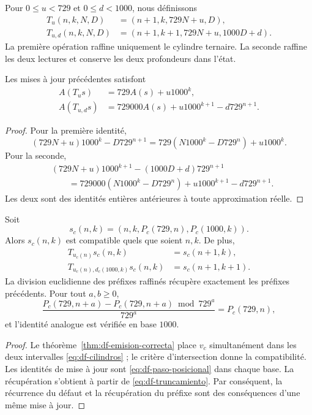 \begin{definition}
Pour \(0\leq u<729\) et \(0\leq d<1000\), nous définissons
\begin{align*}
 T_u(n,k,N,D)&=(n+1,k,729N+u,D),\\
 T_{u,d}(n,k,N,D)&=(n+1,k+1,729N+u,1000D+d).
\end{align*}
La première opération raffine uniquement le cylindre ternaire. La seconde  
raffine les deux lectures et conserve les deux profondeurs dans l'état.
\end{definition}

\begin{proposition}
\label{prop:df-rec-frontera}
Les mises à jour précédentes satisfont
\begin{align}
 A(T_u s)&=729A(s)+u1000^k,\label{eq:df-rec-ternaria}\\
 A(T_{u,d}s)&=729000A(s)+u1000^{k+1}-d729^{n+1}.
 \label{eq:df-rec-conjunta}
\end{align}
\end{proposition}

\begin{proof}
Pour la première identité,
\[
 (729N+u)1000^k-D729^{n+1}
 =729(N1000^k-D729^n)+u1000^k.
\]
Pour la seconde,
\begin{align*}
 &(729N+u)1000^{k+1}-(1000D+d)729^{n+1}\\
 &\qquad=729000(N1000^k-D729^n)
      +u1000^{k+1}-d729^{n+1}.
\end{align*}
Les deux sont des identités entières antérieures à toute approximation réelle.
\end{proof}

\begin{theorem}
\label{thm:df-refinamiento-generado}
Soit
\[
 s_c(n,k)=(n,k,P_c(729,n),P_c(1000,k)).
\]
Alors \(s_c(n,k)\) est compatible quels que soient \(n,k\). De plus,
\begin{align*}
 T_{u_c(n)}s_c(n,k)&=s_c(n+1,k),\\
 T_{u_c(n),d_c(1000,k)}s_c(n,k)&=s_c(n+1,k+1).
\end{align*}
La division euclidienne des préfixes raffinés récupère exactement les
préfixes précédents. Pour tout \(a,b\geq0\),
\[
 \frac{P_c(729,n+a)-P_c(729,n+a)\bmod729^a}{729^a}
 =P_c(729,n),
\]
et l'identité analogue est vérifiée en base \(1000\).
\end{theorem}

\begin{proof}
Le théorème~\ref{thm:df-emision-correcta} place \(v_c\) simultanément dans
les deux intervalles \eqref{eq:df-cilindros} ; le critère d'intersection donne
la compatibilité. Les identités de mise à jour sont
\eqref{eq:df-paso-posicional} dans chaque base. La récupération s'obtient à partir de
\eqref{eq:df-truncamiento}. Par conséquent, la récurrence du défaut et la
récupération du préfixe sont des conséquences d'une même mise à jour.
\end{proof}

